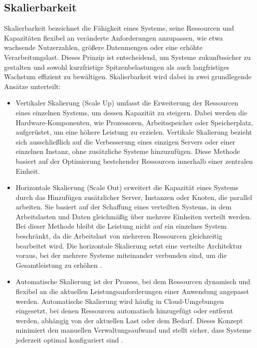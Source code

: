 \begin{itemize}
\end{itemize}



\subsection{Skalierbarkeit}

Skalierbarkeit bezeichnet die Fähigkeit eines Systems, seine Ressourcen und Kapazitäten flexibel an veränderte Anforderungen anzupassen, wie etwa wachsende Nutzerzahlen, größere Datenmengen oder eine erhöhte Verarbeitungslast. Dieses Prinzip ist entscheidend, um Systeme zukunftssicher zu gestalten und sowohl kurzfristige Spitzenbelastungen als auch langfristiges Wachstum effizient zu bewältigen. Skalierbarkeit wird dabei in zwei grundlegende Ansätze unterteilt: 

\begin{itemize}
    \item Vertikaler Skalierung (Scale Up) umfasst die Erweiterung der Ressourcen eines einzelnen Systems, um dessen Kapazität zu steigern. Dabei werden die Hardware-Komponenten, wie Prozessoren, Arbeitsspeicher oder Speicherplatz, aufgerüstet, um eine höhere Leistung zu erzielen. Vertikale Skalierung bezieht sich ausschließlich auf die Verbesserung eines einzigen Servers oder einer einzelnen Instanz, ohne zusätzliche Systeme hinzuzufügen. Diese Methode basiert auf der Optimierung bestehender Ressourcen innerhalb einer zentralen Einheit.
    \item Horizontale Skalierung (Scale Out) erweitert die Kapazität eines Systems durch das Hinzufügen zusätzlicher Server, Instanzen oder Knoten, die parallel arbeiten. Sie basiert auf der Schaffung eines verteilten Systems, in dem Arbeitslasten und Daten gleichmäßig über mehrere Einheiten verteilt werden. Bei dieser Methode bleibt die Leistung nicht auf ein einzelnes System beschränkt, da die Arbeitslast von mehreren Ressourcen gleichzeitig bearbeitet wird. Die horizontale Skalierung setzt eine verteilte Architektur voraus, bei der mehrere Systeme miteinander verbunden sind, um die Gesamtleistung zu erhöhen \cite{ibm-scaling}.
    \item Automatische Skalierung ist der Prozess, bei dem Ressourcen dynamisch und flexibel an die aktuellen Leistungsanforderungen einer Anwendung angepasst werden. Automatische Skalierung wird häufig in Cloud-Umgebungen eingesetzt, bei denen Ressourcen automatisch hinzugefügt oder entfernt werden, abhängig von der aktuellen Last oder dem Bedarf. Dieses Konzept minimiert den manuellen Verwaltungsaufwand und stellt sicher, dass Systeme jederzeit optimal konfiguriert sind \cite{mic-autoscaling}.
\end{itemize}

